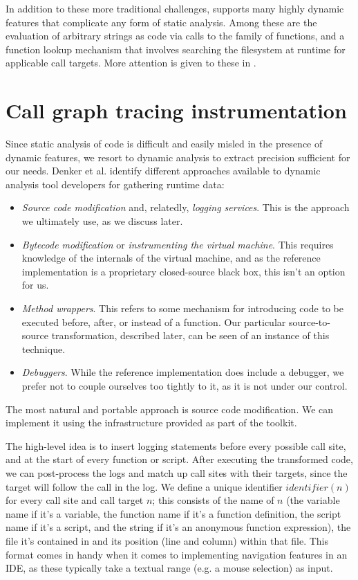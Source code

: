 In addition to these more traditional challenges, \matlab supports many highly
dynamic features that complicate any form of static analysis. Among these are
the evaluation of arbitrary strings as code via calls to the 
family of functions, and a function lookup mechanism that involves searching
the filesystem at runtime for applicable call targets. More attention is given
to these in .

\section{Call graph tracing instrumentation}

Since static analysis of \matlab code is difficult and easily misled in the
presence of dynamic features, we resort to dynamic analysis to extract
precision sufficient for our needs. Denker et al.
\cite{AbstractionsForDynamicAnalysis} identify different approaches available
to dynamic analysis tool developers for gathering runtime data:

\begin{itemize}
\item \emph{Source code modification} and, relatedly, \emph{logging services}.
This is the approach we ultimately use, as we discuss later.
\item \emph{Bytecode modification} or \emph{instrumenting the virtual machine}.
This requires knowledge of the internals of the \matlab virtual machine, and as
the reference \matlab implementation is a proprietary closed-source black box,
this isn't an option for us.
\item \emph{Method wrappers}. This refers to some mechanism for introducing
code to be executed before, after, or instead of a function. Our particular
source-to-source transformation, described later, can be seen of an instance of
this technique.
\item \emph{Debuggers}. While the reference \matlab implementation does include
a debugger, we prefer not to couple ourselves too tightly to it, as it is not
under our control.
\end{itemize}

The most natural and portable approach is source code modification. We can
implement it using the infrastructure provided as part of the \mclab toolkit.

The high-level idea is to insert logging statements before every possible call
site, and at the start of every function or script. After executing the
transformed code, we can post-process the logs and match up call sites with
their targets, since the target will follow the call in the log. We define a
unique identifier $identifier(n)$ for every call site and call target $n$; this
consists of the name of $n$ (the variable name if it's a variable, the function
name if it's a function definition, the script name if it's a script, and the
string  if it's an anonymous function expression), the file
it's contained in and its position (line and column) within that file. This
format comes in handy when it comes to implementing navigation features in an
IDE, as these typically take a textual range (e.g. a mouse selection) as input.

